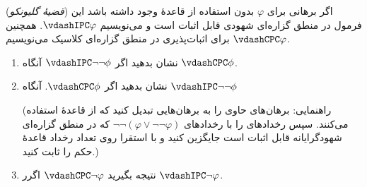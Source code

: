 (\emph{قضیهٔ گلیونکو})
اگر برهانی برای $\varphi$ بدون استفاده از قاعدهٔ  وجود داشته باشد این فرمول در منطق گزاره‌ای شهودی قابل اثبات است و می‌نویسیم $\vdashIPC\varphi$. همچنین برای اثبات‌پذیری در منطق گزاره‌ای کلاسیک می‌نویسیم $\vdashCPC\varphi$.
\begin{enumerate}[label=(\alph*)]
        \item 
    نشان بدهید اگر
    $\vdashIPC\neg\neg\phi$
    آنگاه
    $\vdashCPC\phi$.
    \item 
    نشان بدهید اگر
    $\vdashCPC\phi$.
    آنگاه
    $\vdashIPC\neg\neg\phi$

    (راهنمایی: برهان‌های حاوی
    را به برهان‌هایی تبدیل کنید که از قاعدهٔ
    استفاده می‌کنند. سپس رخدادهای
    را با رخدادهای
    $\neg\neg(\varphi\vee\neg\neg\varphi)$
    که در منطق گزاره‌ای شهودگرایانه قابل اثبات است جایگزین کنید و با استقرا روی تعداد رخداد قاعدهٔ
    حکم را ثابت کنید.)
    \item نتیجه بگیرید
    $\vdashCPC\neg\varphi$ اگرر $\vdashIPC\neg\varphi$.
\end{enumerate}